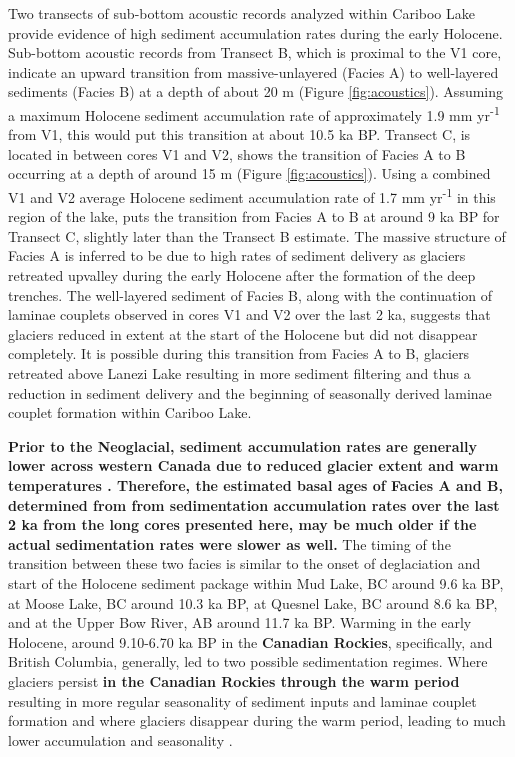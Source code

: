 \documentclass[Royal,times,doublespace,sageh]{sagej}
\begin{document}
Two transects of sub-bottom acoustic records analyzed within Cariboo
Lake provide evidence of high sediment accumulation rates during the
early Holocene. Sub-bottom acoustic records from Transect B, which is
proximal to the V1 core, indicate an upward transition from
massive-unlayered (Facies A) to well-layered sediments (Facies B) at a
depth of about 20 m (Figure \ref{fig:acoustics}). Assuming a maximum
Holocene sediment accumulation rate of approximately 1.9 mm
yr\textsuperscript{-1} from V1, this would put this transition at about
10.5 ka BP. Transect C, is located in between cores V1 and V2, shows the
transition of Facies A to B occurring at a depth of around 15 m (Figure
\ref{fig:acoustics}). Using a combined V1 and V2 average Holocene
sediment accumulation rate of 1.7 mm yr\textsuperscript{-1} in this
region of the lake, puts the transition from Facies A to B at around 9
ka BP for Transect C, slightly later than the Transect B estimate. The
massive structure of Facies A is inferred to be due to high rates of
sediment delivery as glaciers retreated upvalley during the early
Holocene after the formation of the deep trenches. The well-layered
sediment of Facies B, along with the continuation of laminae couplets
observed in cores V1 and V2 over the last 2 ka, suggests that glaciers
reduced in extent at the start of the Holocene but did not disappear
completely. It is possible during this transition from Facies A to B,
glaciers retreated above Lanezi Lake resulting in more sediment
filtering and thus a reduction in sediment delivery and the beginning of
seasonally derived laminae couplet formation within Cariboo Lake.

\textbf{Prior to the Neoglacial, sediment accumulation rates are
generally lower across western Canada due to reduced glacier extent and
warm temperatures
\citep{Steinman2019, Menounos2004, Koch2007a, Osborn2007, Luckman1988, Luckman1993}.
Therefore, the estimated basal ages of Facies A and B, determined from
from sedimentation accumulation rates over the last 2 ka from the long
cores presented here, may be much older if the actual sedimentation
rates were slower as well.} The timing of the transition between these
two facies is similar to the onset of deglaciation and start of the
Holocene sediment package within Mud Lake, BC \citep{Hodder2006b} around
9.6 ka BP, at Moose Lake, BC \citep{Desloges1999} around 10.3 ka BP, at
Quesnel Lake, BC \citep{Gilbert2012} around 8.6 ka BP, and at the Upper
Bow River, AB \citep{Leonard1999} around 11.7 ka BP. Warming in the
early Holocene, around 9.10-6.70 ka BP in the \textbf{Canadian Rockies},
specifically, \citep{Luckman1986} and British Columbia, generally,
\citep{Clague1989, Steinman2019} led to two possible sedimentation
regimes. Where glaciers persist \textbf{in the Canadian Rockies through
the warm period} resulting in more regular seasonality of sediment
inputs and laminae couplet formation \citep[e.g.~Mud
Lake,][]{Hodder2006b} and where glaciers disappear during the warm
period, leading to much lower accumulation and seasonality
\citep[e.g.~Moose Lake,][]{Desloges1999}.
\end{document}
